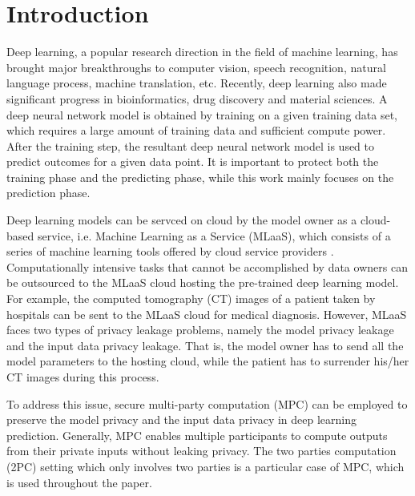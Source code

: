 \documentclass[letterpaper]{article} %
\begin{document}
\section{Introduction}



    \noindent Deep learning, a popular research direction in the field of machine learning,
    has brought major breakthroughs to computer vision, speech recognition, natural language process, machine translation, etc. Recently, deep learning also made significant progress in bioinformatics, drug discovery and material sciences. A deep neural network model is obtained by training on
		a given training data set, which requires a large amount of training data and sufficient compute power.
		After the training step, the resultant deep neural network model is used to predict
		outcomes for a given data point. It is important to protect both the training phase and the predicting phase, while this work mainly focuses on the prediction phase.


    Deep learning models can be servced on cloud by the model owner as a cloud-based service,
		i.e. Machine Learning as a Service (MLaaS),
		which consists of a series of machine learning tools offered by cloud service providers \cite{ChironCloud}.
    Computationally intensive tasks that cannot be accomplished by data owners can be outsourced to
    the MLaaS cloud hosting the pre-trained deep learning model.
    For example, the computed tomography (CT) images of a patient taken by hospitals
    can be sent to the MLaaS cloud for medical diagnosis.
		However, MLaaS faces two types of privacy leakage problems, namely the model privacy leakage and the
		input data privacy leakage. That is, the model owner has to send all the model parameters to the hosting cloud,
		while the patient has to surrender his/her CT images during this process.

    To address this issue, secure multi-party computation (MPC) can be employed to preserve the model privacy
		and the input data privacy in deep learning prediction. Generally, MPC enables multiple participants
		to compute outputs from their private inputs without leaking privacy.
    The two parties computation (2PC) setting which only involves two parties is a particular case of MPC,
		which is used throughout the paper.
\end{document}
